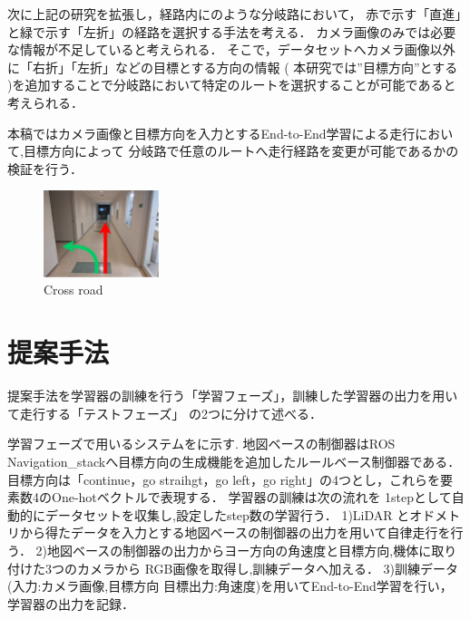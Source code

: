 \documentclass[10pt]{jarticle}
\begin{document}
    次に上記の研究を拡張し，経路内にのような分岐路において，
    赤で示す「直進」と緑で示す「左折」の経路を選択する手法を考える．
    カメラ画像のみでは必要な情報が不足していると考えられる．
    そこで，データセットへカメラ画像以外に「右折」「左折」などの目標とする方向の情報
     ( 本研究では”目標方向”とする )を追加することで分岐路において特定のルートを選択することが可能であると考えられる．

    本稿ではカメラ画像と目標方向を入力とするEnd-to-End学習による走行において,目標方向によって
    分岐路で任意のルートへ走行経路を変更が可能であるかの検証を行う．
    \begin{center}
        \begin{figure}[h]
            \centering
            \includegraphics[width=0.3\textwidth]{./fig/bunki.pdf}
            \caption{Cross road}
            \label{fig:bunki}
        \end{figure}
    \end{center}
    \section{提案手法}%
    提案手法を学習器の訓練を行う「学習フェーズ」，訓練した学習器の出力を用いて走行する「テストフェーズ」
    の2つに分けて述べる．
    
    学習フェーズで用いるシステムをに示す.
    地図ベースの制御器はROS Navigation\_stack\cite{navigation}へ目標方向の生成機能を追加したルールベース制御器である．
    目標方向は「continue，go straihgt，go left，go right」の4つとし，これらを要素数4のOne-hotベクトルで表現する．
    学習器の訓練は次の流れを 1stepとして自動的にデータセットを収集し,設定したstep数の学習行う．
    1)LiDAR とオドメトリから得たデータを入力とする地図ベースの制御器の出力を用いて自律走行を行う．
    2)地図ベースの制御器の出力からヨー方向の角速度と目標方向,機体に取り付けた3つのカメラから
    RGB画像を取得し,訓練データへ加える．
    3)訓練データ(入力:カメラ画像,目標方向 目標出力:角速度)を用いてEnd-to-End学習を行い，学習器の出力を記録．
\end{document}
